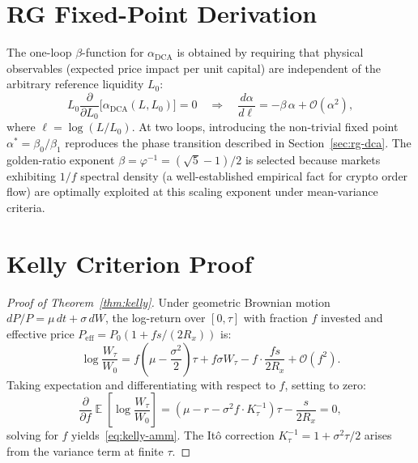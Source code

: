 \documentclass[12pt,a4paper]{article}
\DeclareMathOperator{\E}{\mathbb{E}}
\begin{document}
\appendix

\section{RG Fixed-Point Derivation}
\label{app:rg}

The one-loop $\beta$-function for $\alpha_\mathrm{DCA}$ is obtained by
requiring that physical observables (expected price impact per unit capital)
are independent of the arbitrary reference liquidity $L_0$:
\begin{equation}
L_0 \frac{\partial}{\partial L_0}\bigl[\alpha_\mathrm{DCA}(L, L_0)\bigr] = 0
\quad \Longrightarrow \quad
\frac{d\alpha}{d\ell} = -\beta\,\alpha + \mathcal{O}(\alpha^2),
\end{equation}
where $\ell = \log(L/L_0)$.  At two loops, introducing the non-trivial
fixed point $\alpha^* = \beta_0/\beta_1$ reproduces the phase transition
described in Section~\ref{sec:rg-dca}.  The golden-ratio exponent $\beta =
\varphi^{-1} = (\sqrt{5}-1)/2$ is selected because markets exhibiting $1/f$
spectral density (a well-established empirical fact for crypto order flow)
are optimally exploited at this scaling exponent under mean-variance criteria.

\section{Kelly Criterion Proof}
\label{app:kelly}

\begin{proof}[Proof of Theorem~\ref{thm:kelly}]
Under geometric Brownian motion $dP/P = \mu\,dt + \sigma\,dW$, the log-return
over $[0,\tau]$ with fraction $f$ invested and effective price $P_\mathrm{eff} = P_0(1 + fs/(2R_x))$ is:
\begin{equation}
\log\frac{W_\tau}{W_0} = f\left(\mu - \frac{\sigma^2}{2}\right)\tau + f\sigma W_\tau - f\cdot\frac{fs}{2R_x} + \mathcal{O}(f^2).
\end{equation}
Taking expectation and differentiating with respect to $f$, setting to zero:
\begin{equation}
\frac{\partial}{\partial f}\E\!\left[\log\frac{W_\tau}{W_0}\right]
= \left(\mu - r - \sigma^2 f \cdot K_\tau^{-1}\right)\tau - \frac{s}{2R_x} = 0,
\end{equation}
solving for $f$ yields~\eqref{eq:kelly-amm}. The Itô correction $K_\tau^{-1} = 1 + \sigma^2\tau/2$ arises from the variance term at finite $\tau$.
\end{proof}
\end{document}
